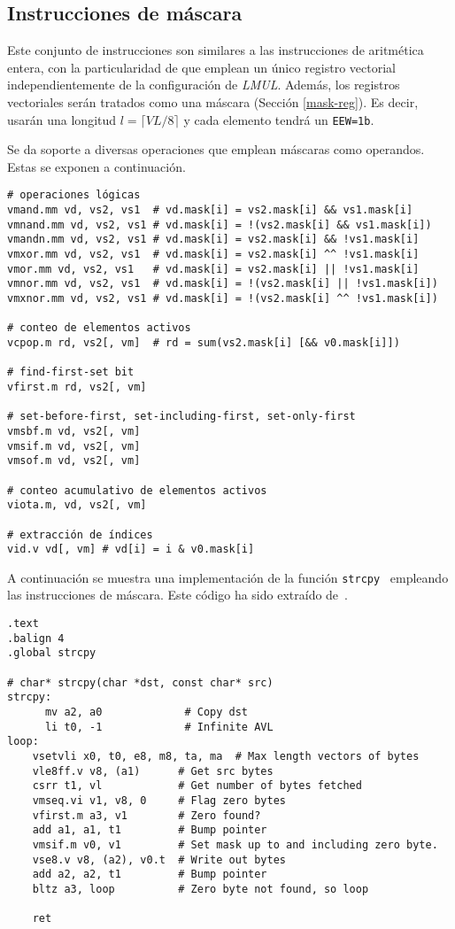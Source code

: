 \subsection{Instrucciones de máscara}{\label{sec:mask-operations}}
Este conjunto de instrucciones son similares a las instrucciones de aritmética
entera, con la particularidad de que emplean un único registro vectorial
independientemente de la configuración de \textit{LMUL}. Además, los registros
vectoriales serán tratados como una máscara (Sección \ref{mask-reg}). Es decir,
usarán una longitud $l = \lceil VL/8 \rceil$ y cada elemento tendrá un
\texttt{EEW=1b}. 

Se da soporte a diversas operaciones que emplean máscaras como operandos. Estas se exponen a continuación. 

\begin{lstlisting}
# operaciones lógicas
vmand.mm vd, vs2, vs1  # vd.mask[i] = vs2.mask[i] && vs1.mask[i] 
vmnand.mm vd, vs2, vs1 # vd.mask[i] = !(vs2.mask[i] && vs1.mask[i])
vmandn.mm vd, vs2, vs1 # vd.mask[i] = vs2.mask[i] && !vs1.mask[i]
vmxor.mm vd, vs2, vs1  # vd.mask[i] = vs2.mask[i] ^^ !vs1.mask[i]
vmor.mm vd, vs2, vs1   # vd.mask[i] = vs2.mask[i] || !vs1.mask[i]
vmnor.mm vd, vs2, vs1  # vd.mask[i] = !(vs2.mask[i] || !vs1.mask[i])
vmxnor.mm vd, vs2, vs1 # vd.mask[i] = !(vs2.mask[i] ^^ !vs1.mask[i])

# conteo de elementos activos
vcpop.m rd, vs2[, vm]  # rd = sum(vs2.mask[i] [&& v0.mask[i]])

# find-first-set bit 
vfirst.m rd, vs2[, vm]

# set-before-first, set-including-first, set-only-first
vmsbf.m vd, vs2[, vm]
vmsif.m vd, vs2[, vm]
vmsof.m vd, vs2[, vm]

# conteo acumulativo de elementos activos
viota.m, vd, vs2[, vm]

# extracción de índices
vid.v vd[, vm] # vd[i] = i & v0.mask[i]
\end{lstlisting}

A continuación se muestra una implementación de la función \texttt{strcpy}~\cite{strcpy} empleando las instrucciones de máscara. Este código ha sido extraído de~\cite{riscv-isa2024}.

\begin{lstlisting}
.text
.balign 4
.global strcpy

# char* strcpy(char *dst, const char* src)
strcpy:
      mv a2, a0             # Copy dst
      li t0, -1             # Infinite AVL
loop:
    vsetvli x0, t0, e8, m8, ta, ma  # Max length vectors of bytes
    vle8ff.v v8, (a1)      # Get src bytes
    csrr t1, vl            # Get number of bytes fetched
    vmseq.vi v1, v8, 0     # Flag zero bytes
    vfirst.m a3, v1        # Zero found?
    add a1, a1, t1         # Bump pointer
    vmsif.m v0, v1         # Set mask up to and including zero byte.
    vse8.v v8, (a2), v0.t  # Write out bytes
    add a2, a2, t1         # Bump pointer
    bltz a3, loop          # Zero byte not found, so loop

    ret
\end{lstlisting}


